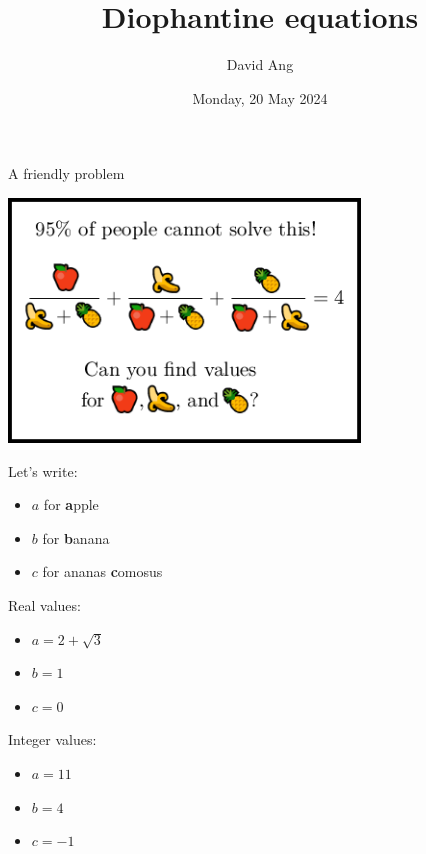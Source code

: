 \documentclass[10pt]{beamer}
\title{Diophantine equations}
\author{David Ang}
\institute{University College London}
\date{Monday, 20 May 2024}
\theoremstyle{definition}
\begin{document}
\frame{\titlepage}

\begin{frame}[t]{A friendly problem}

\begin{center}
\includegraphics[width=0.7\textwidth]{values.png}
\end{center}

\begin{minipage}{0.4\textwidth}
Let's write:
\begin{itemize}
\item $ a $ for \textbf{a}pple
\item $ b $ for \textbf{b}anana
\item $ c $ for ananas \textbf{c}omosus
\end{itemize}
\end{minipage}
\begin{minipage}{0.3\textwidth}
Real values:
\begin{itemize}
\item $ a = 2 + \sqrt{3} $
\item $ b = 1 $
\item $ c = 0 $
\end{itemize}
\end{minipage}
\begin{minipage}{0.28\textwidth}
Integer values:
\begin{itemize}
\item $ a = 11 $
\item $ b = 4 $
\item $ c = -1 $
\end{itemize}
\end{minipage}

\end{frame}
\end{document}
